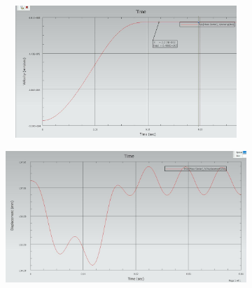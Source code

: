 \documentclass[12pt]{article}
\begin{document}
{\begin{figure}[H]
		\begin{subfigure}{0.49\textwidth}
			\centering\includegraphics[height=5cm,width=1\textwidth,keepaspectratio]{var1_1.jpeg}
			\caption{}
			\label{fig:var1_1.jpeg}
		\end{subfigure}
		\begin{subfigure}{0.49\textwidth}
			\centering\includegraphics[height=5cm,width=1\textwidth,keepaspectratio]{var1_2.jpeg}
			\caption{}
			\label{fig:var1_2.jpeg}
		\end{subfigure}
	\end{figure}
}
\end{document}
